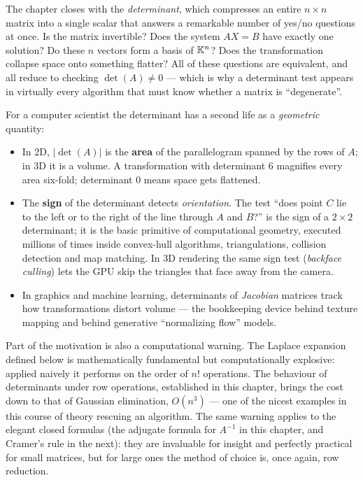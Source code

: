 The chapter closes with the \emph{determinant}, which compresses an entire $n\times n$ matrix into a single scalar that answers a remarkable
number of yes/no questions at once. Is the matrix invertible? Does the system $AX=B$ have exactly one
solution? Do these $n$ vectors form a basis of $\mathbb{K}^n$? Does the transformation collapse space onto
something flatter? All of these questions are equivalent, and all reduce to checking $\det(A)\neq 0$ —
which is why a determinant test appears in virtually every algorithm that must know whether a matrix is
``degenerate''.

For a computer scientist the determinant has a second life as a \emph{geometric} quantity:

\begin{itemize}
\item In 2D, $|\det(A)|$ is the \textbf{area} of the parallelogram spanned by the rows of $A$; in 3D it is
a volume. A transformation with determinant $6$ magnifies every area six-fold; determinant $0$ means space
gets flattened.
\item The \textbf{sign} of the determinant detects \emph{orientation}. The test ``does point $C$ lie to
the left or to the right of the line through $A$ and $B$?'' is the sign of a $2\times 2$ determinant; it
is the basic primitive of computational geometry, executed millions of times inside convex-hull
algorithms, triangulations, collision detection and map matching. In 3D rendering the same sign test
(\emph{backface culling}) lets the GPU skip the triangles that face away from the camera.
\item In graphics and machine learning, determinants of \emph{Jacobian} matrices track how transformations
distort volume — the bookkeeping device behind texture mapping and behind generative ``normalizing flow''
models.
\end{itemize}

Part of the motivation is also a computational warning. The Laplace expansion defined below is
mathematically fundamental but computationally explosive: applied naively it performs on the order of $n!$
operations. The behaviour of determinants under row operations, established in this chapter, brings the
cost down to that of Gaussian elimination, $O(n^3)$ — one of the nicest examples in this course of theory
rescuing an algorithm. The same warning applies to the elegant closed formulas (the adjugate formula
for $A^{-1}$ in this chapter, and Cramer's rule in the next): they are invaluable for insight and perfectly practical for small
matrices, but for large ones the method of choice is, once again, row reduction.

